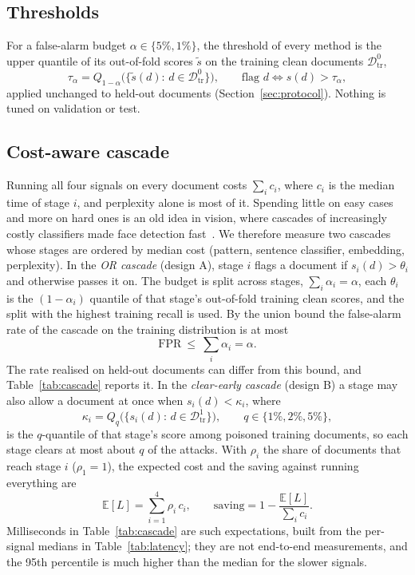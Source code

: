 \subsection{Thresholds}
For a false-alarm budget $\alpha\in\{5\%,1\%\}$, the threshold of every method
is the upper quantile of its out-of-fold scores $\tilde s$ on the training clean
documents $\mathcal{D}_{\mathrm{tr}}^{0}$,
\begin{equation}
    \tau_\alpha=Q_{1-\alpha}\big(\{\tilde s(d):\,d\in\mathcal{D}_{\mathrm{tr}}^{0}\}\big),
    \qquad \text{flag } d \iff s(d)>\tau_\alpha ,
    \label{eq:threshold}
\end{equation}
applied unchanged to held-out documents (Section~\ref{sec:protocol}). Nothing is
tuned on validation or test.

\subsection{Cost-aware cascade}
Running all four signals on every document costs $\sum_i c_i$, where $c_i$ is the
median time of stage $i$, and perplexity alone is most of it. Spending little on
easy cases and more on hard ones is an old idea in vision, where cascades of
increasingly costly classifiers made face detection fast~\cite{viola2001cascade}. We
therefore measure two cascades whose stages are ordered by median cost (pattern, sentence
classifier, embedding, perplexity). In the \emph{OR cascade} (design A), stage
$i$ flags a document if $s_i(d)>\theta_i$ and otherwise passes it on. The budget
is split across stages, $\sum_i\alpha_i=\alpha$, each $\theta_i$ is the
$(1-\alpha_i)$ quantile of that stage's out-of-fold training clean scores, and
the split with the highest training recall is used. By the union bound the
false-alarm rate of the cascade on the training distribution is at most
\begin{equation}
    \mathrm{FPR}\ \le\ \sum_i\alpha_i=\alpha .
    \label{eq:union}
\end{equation}
The rate realised on held-out documents can differ from this bound, and
Table~\ref{tab:cascade} reports it.
In the \emph{clear-early cascade} (design B) a stage may also allow a document at
once when $s_i(d)<\kappa_i$, where
\begin{equation}
    \kappa_i=Q_{q}\big(\{s_i(d):\,d\in\mathcal{D}_{\mathrm{tr}}^{1}\}\big),\qquad q\in\{1\%,2\%,5\%\},
    \label{eq:clear}
\end{equation}
is the $q$-quantile of that stage's score among poisoned training documents, so
each stage clears at most about $q$ of the attacks. With $\rho_i$ the share of
documents that reach stage $i$ ($\rho_1=1$), the expected cost and the saving
against running everything are
\begin{equation}
    \mathbb{E}[L]=\sum_{i=1}^{4}\rho_i\,c_i,\qquad
    \text{saving}=1-\frac{\mathbb{E}[L]}{\sum_i c_i}.
    \label{eq:cost}
\end{equation}
Milliseconds in Table~\ref{tab:cascade} are such expectations, built from the
per-signal medians in Table~\ref{tab:latency}; they are not end-to-end
measurements, and the 95th percentile is much higher than the median for the
slower signals.
